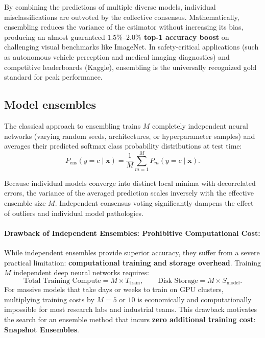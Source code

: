 By combining the predictions of multiple diverse models, individual misclassifications are outvoted by the collective consensus. Mathematically, ensembling reduces the variance of the estimator without increasing its bias, producing an almost guaranteed \textbf{$1.5\%\text{--}2.0\%$ top-1 accuracy boost} on challenging visual benchmarks like ImageNet. In safety-critical applications (such as autonomous vehicle perception and medical imaging diagnostics) and competitive leaderboards (Kaggle), ensembling is the universally recognized gold standard for peak performance.

\subsection{Model ensembles}
\label{sec:independent_ensembles}

The classical approach to ensembling trains $M$ completely independent neural networks (varying random seeds, architectures, or hyperparameter samples) and averages their predicted softmax class probability distributions at test time:
\begin{equation}
P_{\text{ens}}(y = c \mid \mathbf{x}) = \frac{1}{M} \sum_{m=1}^M P_m(y = c \mid \mathbf{x}).
\label{eq:ensemble_averaging}
\end{equation}

\begin{intuition}
Because individual models converge into distinct local minima with decorrelated errors, the variance of the averaged prediction scales inversely with the effective ensemble size $M$. Independent consensus voting significantly dampens the effect of outliers and individual model pathologies.
\end{intuition}

\paragraph{Drawback of Independent Ensembles: Prohibitive Computational Cost:}
While independent ensembles provide superior accuracy, they suffer from a severe practical limitation: \textbf{computational training and storage overhead}. Training $M$ independent deep neural networks requires:
\begin{equation}
\text{Total Training Compute} = M \times T_{\text{train}}, \qquad \text{Disk Storage} = M \times S_{\text{model}}.
\end{equation}
For massive models that take days or weeks to train on GPU clusters, multiplying training costs by $M = 5$ or $10$ is economically and computationally impossible for most research labs and industrial teams. This drawback motivates the search for an ensemble method that incurs \textbf{zero additional training cost}: \textbf{Snapshot Ensembles}.

